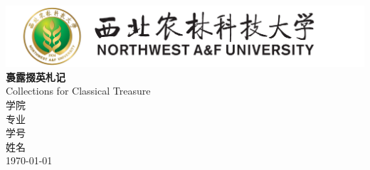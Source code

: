\begin{titlepage}
	\begin{center}
		\includegraphics[width=16cm]{figures/nwafu_icon.png} \\[3cm]
		{ \heiti \bf{裛露掇英札记}}\\[0.5cm]
		{ Collections for Classical Treasure}\\[7cm]
		
		\kaishu\Large{}
		学院 \hspace{0.5cm} \underline{} \\[0.8cm]
		专业 \hspace{0.5cm} \underline{} \\[0.8cm]
		学号 \hspace{0.5cm} \underline{} \\[0.8cm]
		姓名 \hspace{0.5cm} \underline{} \\[1cm]
		
		\vfill
		{ \today}
	\end{center}
\end{titlepage}
